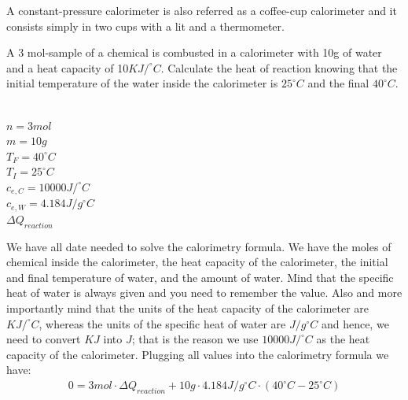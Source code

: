 \documentclass[main.tex]{subfiles}
\begin{document}
\begin{description}
\begin{marginfigure}[-0cm]
      \caption{A constant-pressure calorimeter is also referred as a coffee-cup calorimeter and it consists simply in two cups with a lit and a thermometer.}
      \label{fig:marginfig}
   \end{marginfigure}
\begin{example} %
A 3 mol-sample of a chemical is combusted in a calorimeter with 10g of water and a heat capacity of 10$KJ/^{\circ}C$. Calculate the heat of reaction knowing that the initial temperature of the water inside the calorimeter is $25^{\circ}C$ and the final $40^{\circ}C$.
\\
\\
\begin{tcbitemize}[raster columns=3, raster rows=3, enhanced, sharp corners, raster equal height=rows, raster force size=false, raster column skip=0pt, raster row skip = 0pt]
\tcbitem[blankest, width=1cm]
\tcbitem[header = helpful]
\texta
\tcbitem[header = harmful]
\textb
\tcbitem[firstcol = internal]
\textcn
\tcbitem[swotbox = G]
$n=3mol$\\
$m=10g$\\
$T_{F}=40^{\circ}C$\\
$T_{I}=25^{\circ}C$\\
$c_{e, C}=10000 J/^{\circ}C$\\
$c_{e, W}=4.184 J/g^{\circ}C$\\
\tcbitem[swotbox = A]
$\Delta Q_{reaction}$\\
\end{tcbitemize}%
We have all date needed to solve the calorimetry formula. We have the moles of chemical inside the calorimeter, the heat capacity of the calorimeter, the initial and final temperature of water, and the amount of water. Mind that the specific heat of water is always given and you need to remember the value. Also and more importantly mind that the units of the heat capacity of the calorimeter are $KJ/^{\circ}C$, whereas the units of the specific heat of water are $J/g^{\circ}C$ and hence, we need to convert $KJ$ into $J$; that is the reason we use $10000 J/^{\circ}C$ as the heat capacity of the calorimeter. Plugging all values into the calorimetry formula we have:\\
\begin{equation*}\begin{split}
0=3mol\cdot\Delta Q_{reaction}+10g\cdot 4.184 J/g^{\circ}C\cdot  (40^{\circ}C-25^{\circ}C)  \\

\end{split}
\end{equation*}
\end{example}
\end{description}
\end{document}
